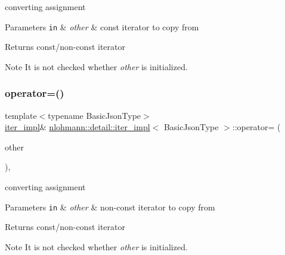 converting assignment 


\begin{DoxyParams}[1]{Parameters}
\mbox{\tt in}  & {\em other} & const iterator to copy from \\
\hline
\end{DoxyParams}
\begin{DoxyReturn}{Returns}
const/non-\/const iterator 
\end{DoxyReturn}
\begin{DoxyNote}{Note}
It is not checked whether {\itshape other} is initialized. 
\end{DoxyNote}
\mbox{\label{classnlohmann_1_1detail_1_1iter__impl_a7159ed1cfe7c423a2baef8bea0c94509}} 
\subsubsection{\texorpdfstring{operator=()}{operator=()}\hspace{0.1cm}{\footnotesize\ttfamily [2/2]}}
{\footnotesize\ttfamily template$<$typename Basic\+Json\+Type$>$ \\
\hyperlink{classnlohmann_1_1detail_1_1iter__impl}{iter\+\_\+impl}\& \hyperlink{classnlohmann_1_1detail_1_1iter__impl}{nlohmann\+::detail\+::iter\+\_\+impl}$<$ Basic\+Json\+Type $>$\+::operator= (\begin{DoxyParamCaption}\item[{const \hyperlink{classnlohmann_1_1detail_1_1iter__impl}{iter\+\_\+impl}$<$ typename std\+::remove\+\_\+const$<$ Basic\+Json\+Type $>$\+::type $>$ \&}]{other }\end{DoxyParamCaption})\hspace{0.3cm}{\ttfamily [inline]}, {\ttfamily [noexcept]}}



converting assignment 


\begin{DoxyParams}[1]{Parameters}
\mbox{\tt in}  & {\em other} & non-\/const iterator to copy from \\
\hline
\end{DoxyParams}
\begin{DoxyReturn}{Returns}
const/non-\/const iterator 
\end{DoxyReturn}
\begin{DoxyNote}{Note}
It is not checked whether {\itshape other} is initialized. 
\end{DoxyNote}
\mbox{\label{classnlohmann_1_1detail_1_1iter__impl_a2b592605b63ae7f5401996ffa3b14393}} 
